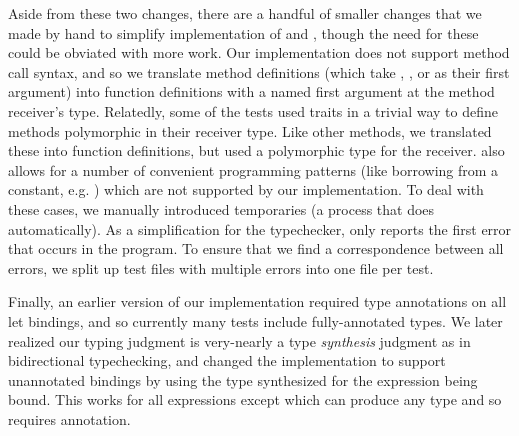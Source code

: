 Aside from these two changes, there are a handful of smaller changes that we
made by hand to simplify implementation of \compiler and \typechecker, though
the need for these could be obviated with more work. Our implementation does not
support method call syntax, and so we translate method definitions (which take
, , or  as their first argument) into
function definitions with a named first argument at the method receiver's type.
Relatedly, some of the tests used traits in a trivial way to define methods
polymorphic in their receiver type. Like other methods, we translated these into
function definitions, but used a polymorphic type for the receiver. \rustc also
allows for a number of convenient programming patterns (like borrowing from a
constant, e.g. ) which are not supported by our implementation. To
deal with these cases, we manually introduced temporaries (a process that \rustc
does automatically). As a simplification for the typechecker, \typechecker only
reports the first error that occurs in the program. To ensure that we find a
correspondence between all errors, we split up test files with multiple errors
into one file per test.

Finally, an earlier version of our implementation required type annotations on
all let bindings, and so currently many tests include fully-annotated types. We
later realized our typing judgment is very-nearly a type \emph{synthesis}
judgment as in bidirectional typechecking, and changed the implementation to
support unannotated bindings by using the type synthesized for the expression
being bound. This works for all expressions except  which can
produce any type and so requires annotation.


